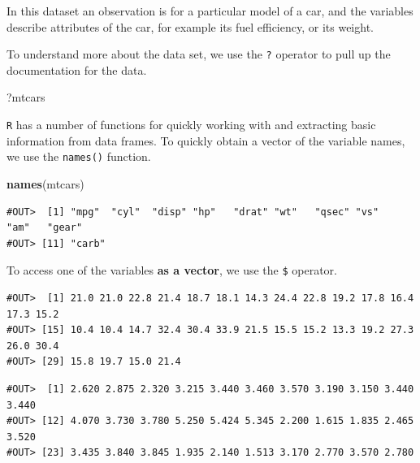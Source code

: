 \documentclass[]{book}
\newenvironment{Shaded}{\begin{snugshade}}{\end{snugshade}}
\newcommand{\KeywordTok}[1]{\textcolor[rgb]{0.13,0.29,0.53}{\textbf{#1}}}
\newcommand{\NormalTok}[1]{#1}
\newcommand{\OperatorTok}[1]{\textcolor[rgb]{0.81,0.36,0.00}{\textbf{#1}}}
\begin{document}
In this dataset an observation is for a particular model of a car, and the variables describe attributes of the car, for example its fuel efficiency, or its weight.

To understand more about the data set, we use the \texttt{?} operator to pull up the documentation for the data.

\begin{Shaded}
\begin{Highlighting}[]
\NormalTok{?mtcars}
\end{Highlighting}
\end{Shaded}

\texttt{R} has a number of functions for quickly working with and extracting basic information from data frames. To quickly obtain a vector of the variable names, we use the \texttt{names()} function.

\begin{Shaded}
\begin{Highlighting}[]
\KeywordTok{names}\NormalTok{(mtcars)}
\end{Highlighting}
\end{Shaded}

\begin{verbatim}
#OUT>  [1] "mpg"  "cyl"  "disp" "hp"   "drat" "wt"   "qsec" "vs"   "am"   "gear"
#OUT> [11] "carb"
\end{verbatim}

To access one of the variables \textbf{as a vector}, we use the \texttt{\$} operator.

\begin{Shaded}
\end{Shaded}

\begin{verbatim}
#OUT>  [1] 21.0 21.0 22.8 21.4 18.7 18.1 14.3 24.4 22.8 19.2 17.8 16.4 17.3 15.2
#OUT> [15] 10.4 10.4 14.7 32.4 30.4 33.9 21.5 15.5 15.2 13.3 19.2 27.3 26.0 30.4
#OUT> [29] 15.8 19.7 15.0 21.4
\end{verbatim}

\begin{Shaded}
\end{Shaded}

\begin{verbatim}
#OUT>  [1] 2.620 2.875 2.320 3.215 3.440 3.460 3.570 3.190 3.150 3.440 3.440
#OUT> [12] 4.070 3.730 3.780 5.250 5.424 5.345 2.200 1.615 1.835 2.465 3.520
#OUT> [23] 3.435 3.840 3.845 1.935 2.140 1.513 3.170 2.770 3.570 2.780
\end{verbatim}
\end{document}
